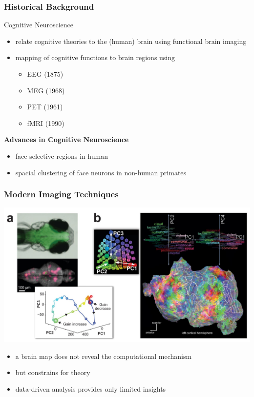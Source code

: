 \documentclass[
t, %
10pt, %
aspectratio=1610, %
ngerman,
english,
]{beamer}
\begin{document}
\begin{frame}
    \frametitle{Historical Background}
    Cognitive Neuroscience
    \begin{itemize}
     \item relate cognitive theories to the (human) brain using functional brain imaging
     \item mapping of cognitive functions to brain regions using
     \begin{itemize}
        \item EEG (1875)
        \item MEG (1968)
        \item PET (1961)
        \item fMRI (1990)
     \end{itemize}
    \end{itemize}
    \vfill
    \textbf{Advances in Cognitive Neuroscience}
    \begin{itemize}
     \item face-selective regions in human
     \item spacial clustering of face neurons in non-human primates
    \end{itemize}

\end{frame}

\begin{frame}
    \frametitle{Modern Imaging Techniques}
    \centering
    \includegraphics[height=0.7\textheight]{figures/figure1}
    \begin{itemize}
     \item a brain map does not reveal the computational mechanism
     \item but constrains for theory
     \item data-driven analysis provides only limited insights
    \end{itemize}

\end{frame}
\end{document}

